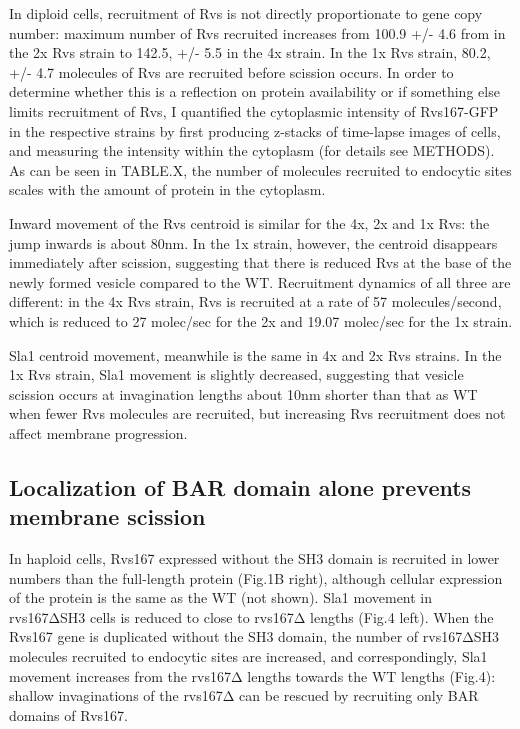 	
	\vspace{5mm}
	In diploid cells, recruitment of Rvs is not directly proportionate to gene copy number: maximum number of Rvs recruited increases from 100.9 +/- 4.6 from in the 2x Rvs strain to 142.5, +/- 5.5 in the 4x strain. In the 1x Rvs strain, 80.2, +/- 4.7 molecules of Rvs are recruited before scission occurs. In order to determine whether this is a reflection on protein availability or if something else limits recruitment of Rvs, I quantified the cytoplasmic intensity of Rvs167-GFP in the respective strains by first producing z-stacks of time-lapse images of cells, and measuring the intensity within the cytoplasm (for details see METHODS). As can be seen in TABLE.X, the number of molecules recruited to endocytic sites scales with the amount of protein in the cytoplasm.  
	\vspace{5mm}
	
	Inward movement of the Rvs centroid is similar for the 4x, 2x and 1x Rvs: the jump inwards is about 80nm. In the 1x strain, however, the centroid disappears immediately after scission, suggesting that there is reduced Rvs at the base of the newly formed vesicle compared to the WT. Recruitment dynamics of all three are different: in the 4x Rvs strain, Rvs is recruited at a rate of 57 molecules/second, which is reduced to 27 molec/sec for the 2x and 19.07 molec/sec for the 1x strain. 

	\vspace{5mm}
	 Sla1 centroid movement, meanwhile is the same in 4x and 2x Rvs strains. In the 1x Rvs strain, Sla1 movement is slightly decreased, suggesting that vesicle scission occurs at invagination lengths about 10nm shorter than that as WT when fewer Rvs molecules are recruited, but increasing Rvs recruitment does not affect membrane progression. 




	
	\subsection{Localization of BAR domain alone prevents membrane scission}
	
		 In haploid cells, Rvs167 expressed without the SH3 domain is recruited in lower numbers than the full-length protein (Fig.1B right), although cellular expression of the protein is the same as the WT (not shown). Sla1 movement in rvs167ΔSH3 cells is reduced to close to rvs167Δ lengths (Fig.4 left). When the Rvs167 gene is duplicated without the SH3 domain, the number of rvs167ΔSH3 molecules recruited to endocytic sites are increased, and correspondingly, Sla1 movement increases from the rvs167Δ lengths towards the WT lengths (Fig.4): shallow invaginations of the rvs167Δ can be rescued by recruiting only BAR domains of Rvs167.
		 
